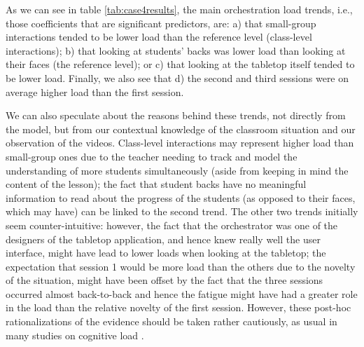 \documentclass[10pt,journal,compsoc]{IEEEtran}
\begin{document}
As we can see in table \ref{tab:case4results}, the main orchestration load trends, i.e., those coefficients that are significant predictors, are: a) that small-group interactions tended to be lower load than the reference level (class-level interactions); b) that looking at students' backs was lower load than looking at their faces (the reference level); or c) that looking at the tabletop itself tended to be lower load. Finally, we also see that d) the second and third sessions were on average higher load than the first session.

We can also speculate about the reasons behind these trends, not directly from the model, but from our contextual knowledge of the classroom situation and our observation of the videos. Class-level interactions may represent higher load than small-group ones due to the teacher needing to track and model the understanding of more students simultaneously (aside from keeping in mind the content of the lesson); the fact that student backs have no meaningful information to read about the progress of the students (as opposed to their faces, which may have) can be linked to the second trend. The other two trends initially seem counter-intuitive: however, the fact that the orchestrator was one of the designers of the tabletop application, and hence knew really well the user interface, might have lead to lower loads when looking at the tabletop; the expectation that session 1 would be more load than the others due to the novelty of the situation, might have been offset by the fact that the three sessions occurred almost back-to-back and hence the fatigue might have had a greater role in the load than the relative novelty of the first session. However, these post-hoc rationalizations of the evidence should be taken rather cautiously, as usual in many studies on cognitive load \cite{de2010cognitive}.
\end{document}
